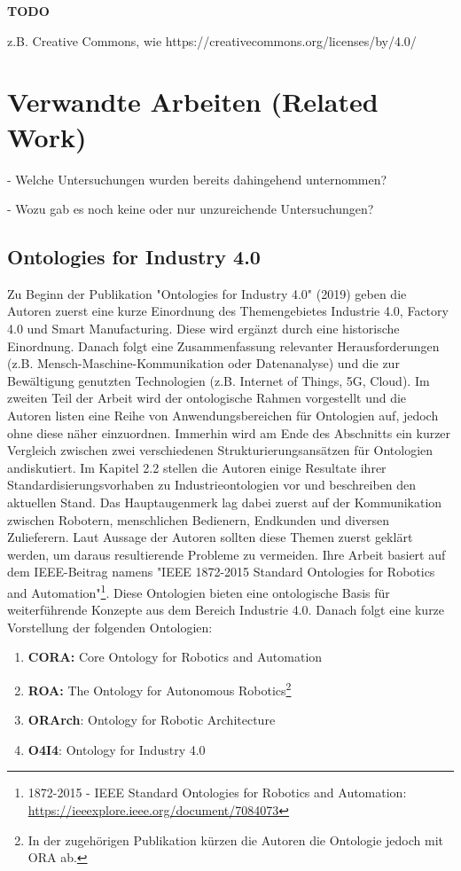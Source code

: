 \documentclass{article}
\begin{document}
\textbf{TODO}

z.B. Creative Commons, wie https://creativecommons.org/licenses/by/4.0/


\section{Verwandte Arbeiten (Related Work)}

- Welche Untersuchungen wurden bereits dahingehend unternommen?

- Wozu gab es noch keine oder nur unzureichende Untersuchungen?

\subsection{Ontologies for Industry 4.0}
%

Zu Beginn der Publikation "Ontologies for Industry 4.0" \cite{kumar2019ontologies} (2019) geben die Autoren zuerst eine kurze Einordnung des Themengebietes Industrie 4.0, Factory 4.0 und Smart Manufacturing.
Diese wird ergänzt durch eine historische Einordnung.
Danach folgt eine Zusammenfassung relevanter Herausforderungen (z.B. Mensch-Maschine-Kommunikation oder Datenanalyse) und die zur Bewältigung genutzten Technologien (z.B. Internet of Things, 5G, Cloud).
Im zweiten Teil der Arbeit wird der ontologische Rahmen vorgestellt und die Autoren listen eine Reihe von Anwendungsbereichen für Ontologien auf, jedoch ohne diese näher einzuordnen.
Immerhin wird am Ende des Abschnitts ein kurzer Vergleich zwischen zwei verschiedenen Strukturierungsansätzen für Ontologien andiskutiert.
Im Kapitel 2.2 stellen die Autoren einige Resultate ihrer Standardisierungsvorhaben zu Industrieontologien vor und beschreiben den aktuellen Stand.
Das Hauptaugenmerk lag dabei zuerst auf der Kommunikation zwischen Robotern, menschlichen Bedienern, Endkunden und diversen Zulieferern.
Laut Aussage der Autoren sollten diese Themen zuerst geklärt werden, um daraus resultierende Probleme zu vermeiden.
Ihre Arbeit basiert auf dem IEEE-Beitrag namens "IEEE 1872-2015 Standard Ontologies for Robotics and Automation"\footnote{1872-2015 - IEEE Standard Ontologies for Robotics and Automation: \url{https://ieeexplore.ieee.org/document/7084073}}.
Diese Ontologien bieten eine ontologische Basis für weiterführende Konzepte aus dem Bereich Industrie 4.0.
Danach folgt eine kurze Vorstellung der folgenden Ontologien:
\begin{enumerate}
    \item \textbf{CORA:} Core Ontology for Robotics and Automation
    \item \textbf{ROA:} The Ontology for Autonomous Robotics\footnote{In der zugehörigen Publikation\cite{olszewska2017ontology} kürzen die Autoren die Ontologie jedoch mit ORA ab.}
    \item \textbf{ORArch}: Ontology for Robotic Architecture
    \item \textbf{O4I4}: Ontology for Industry 4.0
\end{enumerate}
\end{document}
